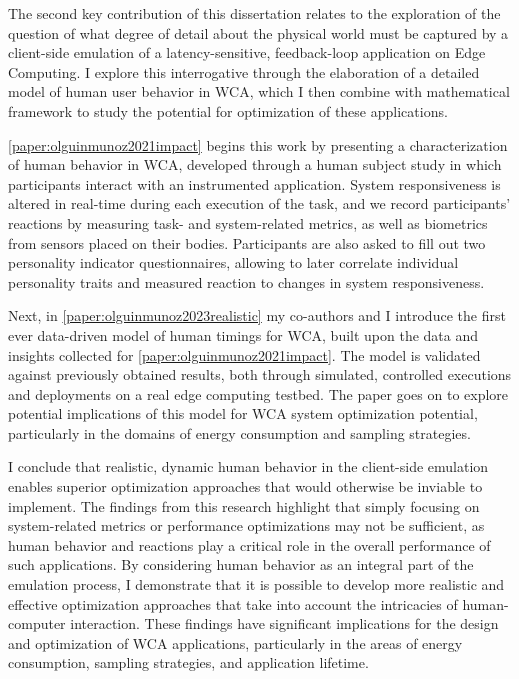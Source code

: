 \medskip

The second key contribution of this dissertation relates to the exploration of the question of what degree of detail about the physical world must be captured by a client-side emulation of a latency-sensitive, feedback-loop application on Edge Computing.
I explore this interrogative through the elaboration of a detailed model of human user behavior in \gls{WCA}, which I then combine with mathematical framework to study the potential for optimization of these applications.

\cref{paper:olguinmunoz2021impact} begins this work by presenting a characterization of human behavior in \gls{WCA}, developed through a human subject study in which participants interact with an instrumented application.
System responsiveness is altered in real-time during each execution of the task, and we record participants' reactions by measuring task- and system-related metrics, as well as biometrics from sensors placed on their bodies.
Participants are also asked to fill out two personality indicator questionnaires, allowing to later correlate individual personality traits and measured reaction to changes in system responsiveness.

Next, in \cref{paper:olguinmunoz2023realistic} my co-authors and I introduce the first ever data-driven model of human timings for \gls{WCA}, built upon the data and insights collected for \cref{paper:olguinmunoz2021impact}.
The model is validated against previously obtained results, both through simulated, controlled executions and deployments on a real edge computing testbed.
The paper goes on to explore potential implications of this model for \gls{WCA} system optimization potential, particularly in the domains of energy consumption and sampling strategies.

I conclude that realistic, dynamic human behavior in the client-side emulation enables superior optimization approaches that would otherwise be inviable to implement.
The findings from this research highlight that simply focusing on system-related metrics or performance optimizations may not be sufficient, as human behavior and reactions play a critical role in the overall performance of such applications.
By considering human behavior as an integral part of the emulation process, I demonstrate that it is possible to develop more realistic and effective optimization approaches that take into account the intricacies of human-computer interaction.
These findings have significant implications for the design and optimization of \gls{WCA} applications, particularly in the areas of energy consumption, sampling strategies, and application lifetime.

